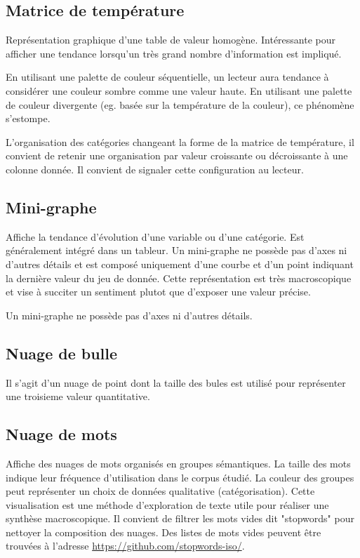 \documentclass[a4paper,12pt]{article}
\begin{document}
\begin{multicols}{2}
\subsection*{Matrice de température}
\label{sec:org3846641}
Représentation graphique d'une table de valeur homogène. \autocite{sosulskiGraphics2019}
Intéressante pour afficher une tendance lorsqu'un très grand nombre d'information est impliqué.

En utilisant une palette de couleur séquentielle, un lecteur aura tendance à considérer une couleur sombre comme une valeur haute. En utilisant une palette de couleur divergente (eg. basée sur la température de la couleur), ce phénomène s'estompe.

L'organisation des catégories changeant la forme de la matrice de température, il convient de retenir une organisation par valeur croissante ou décroissante à une colonne donnée. Il convient de signaler cette configuration au lecteur. \autocite{wilkeVisualizingAmounts2019}
\subsection*{Mini-graphe}
\label{sec:orgcdbe823}
Affiche la tendance d'évolution d'une variable ou d'une catégorie. Est généralement intégré dans un tableur. Un mini-graphe ne possède pas d'axes ni d'autres détails et est composé uniquement d'une courbe et d'un point indiquant la dernière valeur du jeu de donnée. \autocite{sosulskiGraphics2019} Cette représentation est très macroscopique et vise à succiter un sentiment plutot que d'exposer une valeur précise. \autocite{jonathanschwabishDistribution2021}

Un mini-graphe ne possède pas d'axes ni d'autres détails.
\subsection*{Nuage de bulle}
\label{sec:org13e2efe}
Il s'agit d'un nuage de point dont la taille des bules est utilisé pour représenter une troisieme valeur quantitative. \autocite{alansmithLexiqueVisuel}
\subsection*{Nuage de mots}
\label{sec:orgbb46342}
Affiche des nuages de mots organisés en groupes sémantiques. La taille des mots indique leur fréquence d'utilisation dans le corpus étudié. La couleur des groupes peut représenter un choix de données qualitative (catégorisation). \autocite{sosulskiGraphics2019} Cette visualisation est une méthode d'exploration de texte utile pour réaliser une synthèse macroscopique.
Il convient de filtrer les mots vides dit "stopwords" pour nettoyer la composition des nuages. \autocite{jonathanschwabishQualitative2021} Des listes de mots vides peuvent être trouvées à l'adresse \url{https://github.com/stopwords-iso/}.

\end{multicols}
\end{document}
